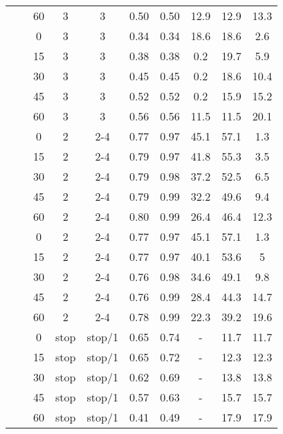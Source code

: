 \begin{longtable}[t]{cccccccccc}
	\nopagebreak
	& \multirow{-5}{*}{\centering\arraybackslash 0.2} & 60 & 3 & 3 & 0.50 & 0.50 & 12.9 & 12.9 & 13.3\\
	\nopagebreak
	&  & 0 & 3 & 3 & 0.34 & 0.34 & 18.6 & 18.6 & 2.6\\
	\nopagebreak
	&  & 15 & 3 & 3 & 0.38 & 0.38 & 0.2 & 19.7 & 5.9\\
	\nopagebreak
	&  & 30 & 3 & 3 & 0.45 & 0.45 & 0.2 & 18.6 & 10.4\\
	\nopagebreak
	&  & 45 & 3 & 3 & 0.52 & 0.52 & 0.2 & 15.9 & 15.2\\
	\nopagebreak
	\multirow{-10}{*}{\centering\arraybackslash 9} & \multirow{-5}{*}{\centering\arraybackslash 0.33} & 60 & 3 & 3 & 0.56 & 0.56 & 11.5 & 11.5 & 20.1\\
	\cmidrule{1-10}\pagebreak[0]
	&  & 0 & 2 & 2-4 & 0.77 & 0.97 & 45.1 & 57.1 & 1.3\\
	\nopagebreak
	&  & 15 & 2 & 2-4 & 0.79 & 0.97 & 41.8 & 55.3 & 3.5\\
	\nopagebreak
	&  & 30 & 2 & 2-4 & 0.79 & 0.98 & 37.2 & 52.5 & 6.5\\
	\nopagebreak
	&  & 45 & 2 & 2-4 & 0.79 & 0.99 & 32.2 & 49.6 & 9.4\\
	\nopagebreak
	& \multirow{-5}{*}{\centering\arraybackslash 0.2} & 60 & 2 & 2-4 & 0.80 & 0.99 & 26.4 & 46.4 & 12.3\\
	\nopagebreak
	&  & 0 & 2 & 2-4 & 0.77 & 0.97 & 45.1 & 57.1 & 1.3\\
	\nopagebreak
	&  & 15 & 2 & 2-4 & 0.77 & 0.97 & 40.1 & 53.6 & 5\\
	\nopagebreak
	&  & 30 & 2 & 2-4 & 0.76 & 0.98 & 34.6 & 49.1 & 9.8\\
	\nopagebreak
	&  & 45 & 2 & 2-4 & 0.76 & 0.99 & 28.4 & 44.3 & 14.7\\
	\nopagebreak
	\multirow{-10}{*}{\centering\arraybackslash 10} & \multirow{-5}{*}{\centering\arraybackslash 0.33} & 60 & 2 & 2-4 & 0.78 & 0.99 & 22.3 & 39.2 & 19.6\\
	\cmidrule{1-10}\pagebreak[0]
	&  & 0 & stop & stop/1 & 0.65 & 0.74 & - & 11.7 & 11.7\\
	\nopagebreak
	&  & 15 & stop & stop/1 & 0.65 & 0.72 & - & 12.3 & 12.3\\
	\nopagebreak
	&  & 30 & stop & stop/1 & 0.62 & 0.69 & - & 13.8 & 13.8\\
	\nopagebreak
	&  & 45 & stop & stop/1 & 0.57 & 0.63 & - & 15.7 & 15.7\\
	\nopagebreak
	& \multirow{-5}{*}{\centering\arraybackslash 0.2} & 60 & stop & stop/1 & 0.41 & 0.49 & - & 17.9 & 17.9\\

\end{longtable}
